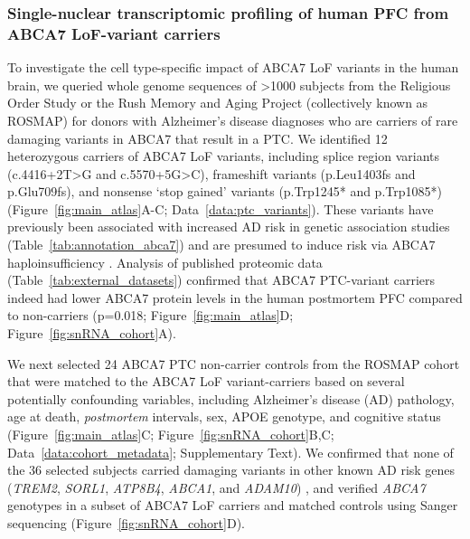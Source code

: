 \subsubsection{Single-nuclear transcriptomic profiling of human PFC from ABCA7 LoF-variant carriers} 
To investigate the cell type-specific impact of ABCA7 LoF variants in the human brain, we queried whole genome sequences of >1000 subjects from the Religious Order Study or the Rush Memory and Aging Project (collectively known as ROSMAP) for donors with Alzheimer’s disease diagnoses who are carriers of rare damaging variants in ABCA7 that result in a PTC. We identified 12 heterozygous carriers of ABCA7 LoF variants, including splice region variants (c.4416+2T>G and c.5570+5G>C), frameshift variants (p.Leu1403fs and p.Glu709fs), and nonsense ‘stop gained’ variants (p.Trp1245* and p.Trp1085*) (Figure~\ref{fig:main_atlas}A-C; Data~\ref{data:ptc_variants}). These variants have previously been associated with increased AD risk in genetic association studies (Table~\ref{tab:annotation_abca7}) \cite{Steinberg2015-mu,Holstege2022-vp} and are presumed to induce risk via ABCA7 haploinsufficiency \cite{Duchateau2024-rf}. Analysis of published proteomic data \cite{Johnson2020-ip} (Table~\ref{tab:external_datasets}) confirmed that ABCA7 PTC-variant carriers indeed had lower ABCA7 protein levels in the human postmortem PFC compared to non-carriers (p=0.018; Figure~\ref{fig:main_atlas}D; Figure~\ref{fig:snRNA_cohort}A). 

We next selected 24 ABCA7 PTC non-carrier controls from the ROSMAP cohort that were matched to the ABCA7 LoF variant-carriers based on several potentially confounding variables, including Alzheimer's disease (AD) pathology, age at death, \textit{postmortem} intervals, sex, APOE genotype, and cognitive status (Figure~\ref{fig:main_atlas}C; Figure~\ref{fig:snRNA_cohort}B,C; Data~\ref{data:cohort_metadata}; Supplementary Text). We confirmed that none of the 36 selected subjects carried damaging variants in other known AD risk genes (\textit{TREM2}, \textit{SORL1}, \textit{ATP8B4}, \textit{ABCA1}, and \textit{ADAM10}) \cite{Holstege2022-vp}, and verified \textit{ABCA7} genotypes in a subset of ABCA7 LoF carriers and matched controls using Sanger sequencing (Figure~\ref{fig:snRNA_cohort}D).


